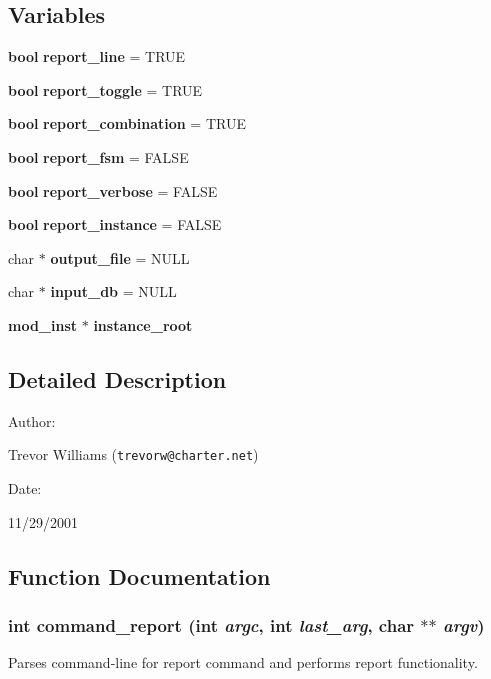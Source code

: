 \subsection*{Variables}
\begin{CompactItemize}
\item 
{\bf bool} {\bf report\_\-line} = TRUE
\item 
{\bf bool} {\bf report\_\-toggle} = TRUE
\item 
{\bf bool} {\bf report\_\-combination} = TRUE
\item 
{\bf bool} {\bf report\_\-fsm} = FALSE
\item 
{\bf bool} {\bf report\_\-verbose} = FALSE
\item 
{\bf bool} {\bf report\_\-instance} = FALSE
\item 
char $\ast$ {\bf output\_\-file} = NULL
\item 
char $\ast$ {\bf input\_\-db} = NULL
\item 
{\bf mod\_\-inst} $\ast$ {\bf instance\_\-root}
\end{CompactItemize}


\subsection{Detailed Description}


\begin{Desc}
\item[Author: ]\par
Trevor Williams ({\tt trevorw@charter.net}) \end{Desc}
\begin{Desc}
\item[Date: ]\par
11/29/2001\end{Desc}


\subsection{Function Documentation}
\subsubsection{\setlength{\rightskip}{0pt plus 5cm}int command\_\-report (int {\em argc}, int {\em last\_\-arg}, char $\ast$$\ast$ {\em argv})}\label{report_8c_a15}


Parses command-line for report command and performs report functionality.

